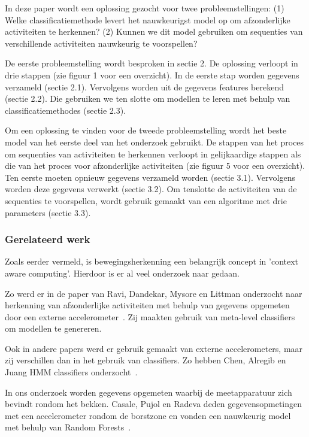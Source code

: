 \documentclass{article}
\begin{document}
In deze paper wordt een oplossing gezocht voor twee probleemstellingen: (1) Welke classificatiemethode levert het nauwkeurigst model op om afzonderlijke activiteiten te herkennen? (2) Kunnen we dit model gebruiken om sequenties van verschillende activiteiten nauwkeurig te voorspellen?

De eerste probleemstelling wordt besproken in sectie 2. De oplossing verloopt in drie stappen (zie figuur 1 voor een overzicht). In de eerste stap worden gegevens verzameld (sectie 2.1). Vervolgens worden uit de gegevens features berekend (sectie 2.2). Die gebruiken we ten slotte om modellen te leren met behulp van classificatiemethodes (sectie 2.3).

Om een oplossing te vinden voor de tweede probleemstelling wordt het beste model van het eerste deel van het onderzoek gebruikt. De stappen van het proces om sequenties van activiteiten te herkennen verloopt in gelijkaardige stappen als die van het proces voor afzonderlijke activiteiten (zie figuur 5 voor een overzicht). Ten eerste moeten opnieuw gegevens verzameld worden (sectie 3.1). Vervolgens worden deze gegevens verwerkt (sectie 3.2). Om tenslotte de activiteiten van de sequenties te voorspellen, wordt gebruik gemaakt van een algoritme met drie parameters (sectie 3.3).

\subsubsection{Gerelateerd werk}

Zoals eerder vermeld, is bewegingsherkenning een belangrijk concept in 'context aware computing'. Hierdoor is er al veel onderzoek naar gedaan.

Zo werd er in de paper van Ravi, Dandekar, Mysore en Littman onderzocht naar herkenning van afzonderlijke activiteiten met behulp van gegevens opgemeten door een externe accelerometer~\cite{Ravi and others:act.recogn.}.  Zij maakten gebruik van meta-level classifiers om modellen te genereren.

Ook in andere papers werd er gebruik gemaakt van externe accelerometers, maar zij verschillen dan in het gebruik van classifiers. Zo hebben Chen, Alregib en Juang HMM classifiers onderzocht~\cite{6dmotion}.

In ons onderzoek worden gegevens opgemeten waarbij de meetapparatuur zich bevindt rondom het bekken. Casale, Pujol en Radeva deden gegevensopmetingen met een accelerometer rondom de borstzone en vonden een nauwkeurig model met behulp van Random Forests~\cite{act.rec.}.
\end{document}
